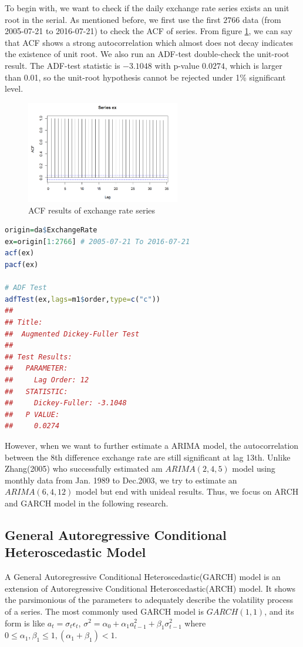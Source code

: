 \documentclass[12pt, a4paper, titlepage]{article}
\begin{document}
To begin with, we want to check if the daily exchange rate series exists an unit root in the serial. As mentioned before, we first use the first $2766$ data (from 2005-07-21 to 2016-07-21) to check the ACF of series. From figure \ref{ACF}, we can say that ACF shows a strong autocorrelation which almost does not decay indicates the existence of unit root. We also run an ADF-test double-check the unit-root result. The ADF-test statistic is $-3.1048$ with p-value $0.0274$, which is larger than 0.01, so the unit-root hypothesis cannot be rejected under 1\% significant level.\\
\begin{figure}[h!]
\begin{center}
\caption{ACF results of exchange rate series}\label{ACF}
\includegraphics[width=0.6\textwidth]{ex_acf.png} 
\end{center}
\end{figure}
\begin{lstlisting}[language=R] 
origin=da$ExchangeRate
ex=origin[1:2766] # 2005-07-21 To 2016-07-21
acf(ex)
pacf(ex)

# ADF Test
adfTest(ex,lags=m1$order,type=c("c"))
## 
## Title:
##  Augmented Dickey-Fuller Test
## 
## Test Results:
##   PARAMETER:
##     Lag Order: 12
##   STATISTIC:
##     Dickey-Fuller: -3.1048
##   P VALUE:
##     0.0274 
\end{lstlisting}

However, when we want to further estimate a ARIMA model, the autocorrelation between the 8th difference exchange rate are still significant at lag 13th. Unlike Zhang(2005) who successfully estimated am $ARIMA(2,4,5)$ model using monthly data from Jan. 1989 to Dec.2003, we try to estimate an $ARIMA(6,4,12)$ model but end with unideal results. Thus, we focus on ARCH and GARCH model in the following research.

\subsection{General Autoregressive Conditional Heteroscedastic Model}
A General Autoregressive Conditional Heteroscedastic(GARCH) model is an extension of Autoregressive Conditional Heteroscedastic(ARCH) model. It shows the parsimonious of the parameters to adequately describe the volatility process of a series. The most commonly used GARCH model is $GARCH(1,1)$, and its form is like $a_t = \sigma_t \epsilon_t$, $\sigma^2 = \alpha_0 + \alpha_1 a_{t-1}^2 + \beta_1 \sigma_{t-1}^2$ where $0 \leq \alpha_1, \beta_1 \leq 1, (\alpha_1 + \beta_1) <1$.\\ 
\end{document}
